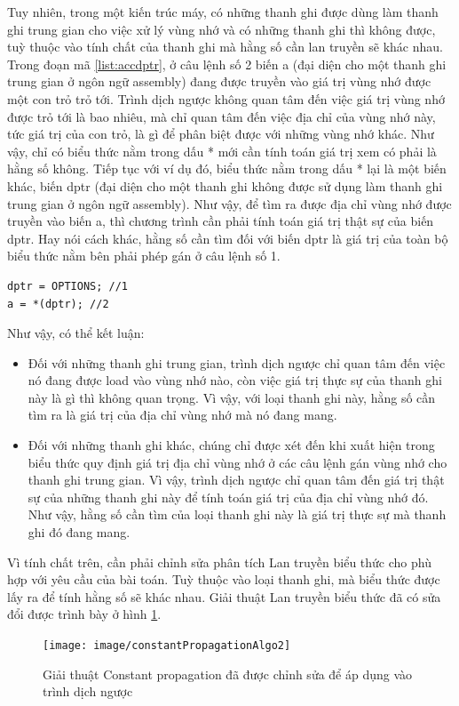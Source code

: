 Tuy nhiên, trong một kiến trúc máy, có những thanh ghi được dùng làm thanh ghi trung gian cho việc xử lý vùng nhớ và có những thanh ghi thì không được, tuỳ thuộc vào tính chất của thanh ghi mà hằng số cần lan truyền sẽ khác nhau. Trong đoạn mã \ref{list:accdptr}, ở câu lệnh số 2 biến a (đại diện cho một thanh ghi trung gian ở ngôn ngữ assembly) đang được truyền vào giá trị vùng nhớ được một con trỏ trỏ tới. Trình dịch ngược không quan tâm đến việc giá trị vùng nhớ được trỏ tới là bao nhiêu, mà chỉ quan tâm đến việc địa chỉ của vùng nhớ này, tức giá trị của con trỏ, là gì để phân biệt được với những vùng nhớ khác. Như vậy, chỉ có biểu thức nằm trong dấu * mới cần tính toán giá trị xem có phải là hằng số không. Tiếp tục với ví dụ đó, biểu thức nằm trong dấu * lại là một biến khác, biến dptr (đại diện cho một thanh ghi không được sử dụng làm thanh ghi trung gian ở ngôn ngữ assembly). Như vậy, để tìm ra được địa chỉ vùng nhớ được truyền vào biến a, thì chương trình cần phải tính toán giá trị thật sự của biến dptr. Hay nói cách khác, hằng số cần tìm đối với biến dptr là giá trị của toàn bộ biểu thức nằm bên phải phép gán ở câu lệnh số 1.
\begin{lstlisting}[caption={Đoạn mã thể hiện hai loại thanh ghi},label={list:accdptr}]
dptr = OPTIONS; //1
a = *(dptr); //2
\end{lstlisting}

Như vậy, có thể kết luận:
\begin{itemize}
	\item Đối với những thanh ghi trung gian, trình dịch ngược chỉ quan tâm đến việc nó đang được load vào vùng nhớ nào, còn việc giá trị thực sự của thanh ghi này là gì thì không quan trọng. Vì vậy, với loại thanh ghi này, hằng số cần tìm ra là giá trị của địa chỉ vùng nhớ mà nó đang mang.
	\item Đối với những thanh ghi khác, chúng chỉ được xét đến khi xuất hiện trong biểu thức quy định giá trị địa chỉ vùng nhớ ở các câu lệnh gán vùng nhớ cho thanh ghi trung gian. Vì vậy, trình dịch ngược chỉ quan tâm đến giá trị thật sự của những thanh ghi này để tính toán giá trị của địa chỉ vùng nhớ đó. Như vậy, hằng số cần tìm của loại thanh ghi này là giá trị thực sự mà thanh ghi đó đang mang.
\end{itemize}

Vì tính chất trên, cần phải chỉnh sửa phân tích Lan truyền biểu thức cho phù hợp với yêu cầu của bài toán. Tuỳ thuộc vào loại thanh ghi, mà biểu thức được lấy ra để tính hằng số sẽ khác nhau. Giải thuật Lan truyền biểu thức đã có sửa đổi được trình bày ở hình \ref{fig:constantpropagationalgo2}.
\begin{figure}
	\centering
	\texttt{[image: image/constantPropagationAlgo2]}
	\caption{Giải thuật Constant propagation đã được chỉnh sửa để áp dụng vào trình dịch ngược}
	\label{fig:constantpropagationalgo2}
\end{figure}


